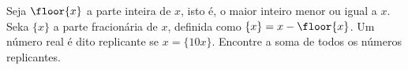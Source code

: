 Seja $\floor{x}$ a parte inteira de $x$, isto é, o maior inteiro menor ou igual a $x$.
Seka $\{x\}$ a parte fracionária de $x$, definida como $\{x\} = x - \floor{x}$.
Um número real é dito replicante se $x = \{10x\}$.
Encontre a soma de todos os números replicantes.
